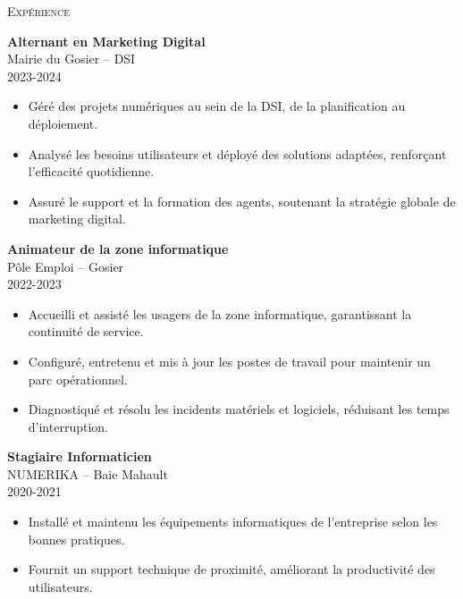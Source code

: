 \documentclass[11pt,a4paper]{article}
\newcommand{\headright}[1]{\vspace*{2.5ex}\textsc{\Large\color{cvblue}#1}\par%
  \vspace*{-2ex}{\color{cvblue}\hrulefill}\par}
\begin{document}
\begin{minipage}[t]{0.56\textwidth}
  \setlength{\parskip}{0.8ex}
  \vspace{2ex}

  \headright{Expérience}
  
\colorbox{maincolor}{%
  \begin{minipage}{\linewidth}
    \textbf{Alternant en Marketing Digital} \\ Mairie du Gosier – DSI \\ 2023-2024
    \begin{itemize}
      \item Géré des projets numériques au sein de la DSI, de la planification au déploiement. \item Analysé les besoins utilisateurs et déployé des solutions adaptées, renforçant l’efficacité quotidienne. \item Assuré le support et la formation des agents, soutenant la stratégie globale de marketing digital.
    \end{itemize}
  \end{minipage}}

\vspace{3mm}


\colorbox{maincolor}{%
  \begin{minipage}{\linewidth}
    \textbf{Animateur de la zone informatique} \\ Pôle Emploi – Gosier \\ 2022-2023
    \begin{itemize}
      \item Accueilli et assisté les usagers de la zone informatique, garantissant la continuité de service. \item Configuré, entretenu et mis à jour les postes de travail pour maintenir un parc opérationnel. \item Diagnostiqué et résolu les incidents matériels et logiciels, réduisant les temps d’interruption.
    \end{itemize}
  \end{minipage}}

\vspace{3mm}


\colorbox{maincolor}{%
  \begin{minipage}{\linewidth}
    \textbf{Stagiaire Informaticien} \\ NUMERIKA – Baie Mahault \\ 2020-2021
    \begin{itemize}
      \item Installé et maintenu les équipements informatiques de l’entreprise selon les bonnes pratiques. \item Fournit un support technique de proximité, améliorant la productivité des utilisateurs.
    \end{itemize}
  \end{minipage}}        %


\end{minipage}
\end{document}
